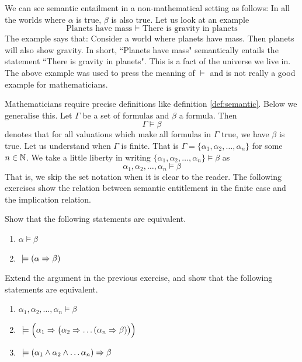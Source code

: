 We can see semantic entailment in a non-mathematical setting as follows: In all the worlds where $\alpha$ is true, $\beta$ is also true. Let us look at an example
\[
\text{Planets have mass } \models \text{ There is gravity in planets}
\]
The example says that: Consider a world where planets have mass. Then planets will also show gravity. In short, ``Planets have mass" semantically entails the statement ``There is gravity in planets". This is a fact of the universe we live in. The above example was used to press the meaning of $\models$ and is not really a good example for mathematicians. 

Mathematicians require precise definitions like definition \ref{def:semantic}. Below we generalise this. Let $\Gamma$ be a set of formulas and $\beta$ a formula. Then 
\[
\Gamma \models \beta
\]
denotes that for all valuations which make all formulas in $\Gamma$ true, we have $\beta$ is true. Let us understand when $\Gamma$ is finite. That is $\Gamma = \{\alpha_1,\alpha_2,\dots,\alpha_n\}$ for some $n \in \mathbb{N}$. We take a little liberty in writing $\{\alpha_1,\alpha_2,\dots,\alpha_n\} \models \beta$ as
\[
\alpha_1,\alpha_2,\dots,\alpha_n \models \beta
\]
That is, we skip the set notation when it is clear to the reader. The following exercises show the relation between semantic entitlement in the finite case and the implication relation.

\begin{exercise}
Show that the following statements are equivalent.
\begin{enumerate}
\item $\alpha \models \beta$
\item \true $~\models (\alpha \Rightarrow \beta)$
\end{enumerate}
\end{exercise}

\begin{exercise}
Extend the argument in the previous exercise, and show that the following statements are equivalent.
\begin{enumerate}
\item $\alpha_1,\alpha_2,\dots,\alpha_n \models \beta$
\item \true $~ \models \Big(\alpha_1 \Rightarrow \big(\alpha_2 \Rightarrow \dots (\alpha_n \Rightarrow \beta)\big)\Big)$
\item \true $~\models (\alpha_1 \wedge \alpha_2 \wedge \dots \alpha_n) \Rightarrow \beta$
\end{enumerate}
\label{exercise:semequiv}
\end{exercise} 

